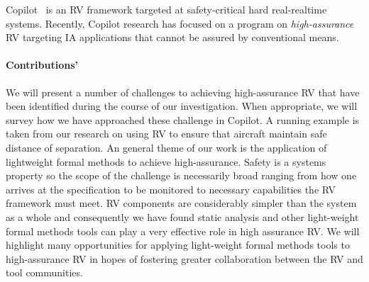 Copilot~\cite{copilot, pike-isse-13}  is an RV framework  targeted at
safety-critical hard real-realtime systems. Recently, Copilot research
has  focused on a program on \emph{high-assurance} RV targeting IA
applications that cannot be assured by conventional means.


\paragraph{Contributions'} We will present a number of challenges to
achieving high-assurance RV that have been identified during the
course of our investigation.  When appropriate, we will survey how we
have approached these challenge in Copilot.  A running example is  taken
from our research on using RV to ensure that aircraft  maintain safe
distance of separation. An general theme of our
work is the application of lightweight formal methods to achieve
high-assurance.  Safety is a systems property so the scope of the  challenge
is necessarily broad ranging from how one arrives at the specification
to be monitored to necessary capabilities the  RV framework must meet.
RV components are considerably simpler than the system as a whole and
consequently we have found static analysis and other light-weight
formal methods tools can play a very effective role in high assurance
RV.  We will highlight many opportunities for applying light-weight
formal methods tools to high-assurance RV in hopes of fostering
greater collaboration between the RV and tool communities.
